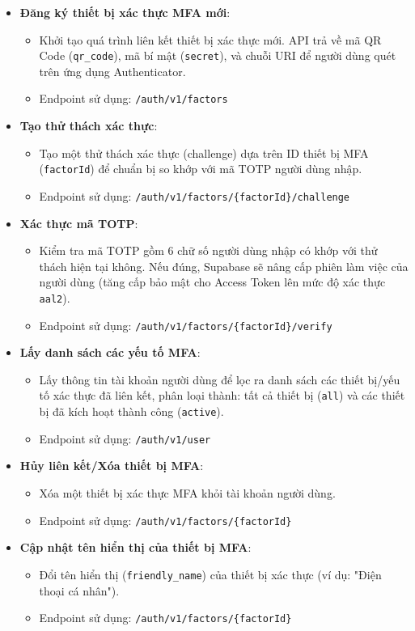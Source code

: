 \begin{itemize}
\item \textbf{Đăng ký thiết bị xác thực MFA mới}:
\begin{itemize}
\item Khởi tạo quá trình liên kết thiết bị xác thực mới. API trả về mã QR Code (\texttt{qr\_code}), mã bí mật (\texttt{secret}), và chuỗi URI để người dùng quét trên ứng dụng Authenticator.
\item Endpoint sử dụng: \texttt{/auth/v1/factors}
\end{itemize}

\item \textbf{Tạo thử thách xác thực}:
\begin{itemize}
\item Tạo một thử thách xác thực (challenge) dựa trên ID thiết bị MFA (\texttt{factorId}) để chuẩn bị so khớp với mã TOTP người dùng nhập.
\item Endpoint sử dụng: \texttt{/auth/v1/factors/\{factorId\}/challenge}
\end{itemize}

\item \textbf{Xác thực mã TOTP}:
\begin{itemize}
\item Kiểm tra mã TOTP gồm 6 chữ số người dùng nhập có khớp với thử thách hiện tại không. Nếu đúng, Supabase sẽ nâng cấp phiên làm việc của người dùng (tăng cấp bảo mật cho Access Token lên mức độ xác thực \texttt{aal2}).
\item Endpoint sử dụng: \texttt{/auth/v1/factors/\{factorId\}/verify}
\end{itemize}

\item \textbf{Lấy danh sách các yếu tố MFA}:
\begin{itemize}
\item Lấy thông tin tài khoản người dùng để lọc ra danh sách các thiết bị/yếu tố xác thực đã liên kết, phân loại thành: tất cả thiết bị (\texttt{all}) và các thiết bị đã kích hoạt thành công (\texttt{active}).
\item Endpoint sử dụng: \texttt{/auth/v1/user}
\end{itemize}

\item \textbf{Hủy liên kết/Xóa thiết bị MFA}:
\begin{itemize}
\item Xóa một thiết bị xác thực MFA khỏi tài khoản người dùng.
\item Endpoint sử dụng: \texttt{/auth/v1/factors/\{factorId\}}
\end{itemize}

\item \textbf{Cập nhật tên hiển thị của thiết bị MFA}:
\begin{itemize}
\item Đổi tên hiển thị (\texttt{friendly\_name}) của thiết bị xác thực (ví dụ: "Điện thoại cá nhân").
\item Endpoint sử dụng: \texttt{/auth/v1/factors/\{factorId\}}
\end{itemize}
\end{itemize}

